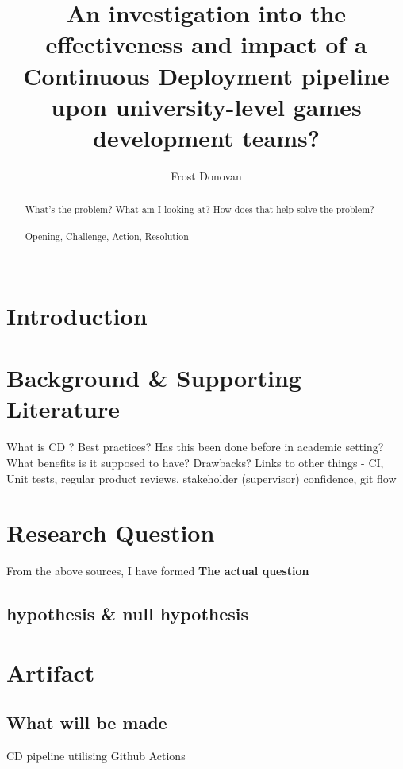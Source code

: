 \documentclass[lettersize,journal]{IEEEtran}
\begin{document}
\title{An investigation into the effectiveness and impact of a Continuous Deployment pipeline upon university-level games development teams?}

\author{Frost Donovan}

\maketitle

\begin{abstract}
    What's the problem? What am I looking at? How does that help solve the problem? \\
    \\
    Opening, Challenge, Action, Resolution \\
    \\
\end{abstract}

\section{Introduction}
    

\section{Background \& Supporting Literature}
    What is CD \cite{ContDelIntro,bamboo}? Best practices\cite{duvall2007continuous}? Has this been done before in academic setting\cite{CDCourse2014,CDMobileDev,Tornado,IndustryAcademyDenmark}? What benefits is it supposed to have\cite{ContDelIntro}? Drawbacks\cite{ContDelChall}? Links to other things - CI\cite{CICDCD}, Unit tests, regular product reviews, stakeholder (supervisor) confidence, git flow \cite{gitBranching}

\section{Research Question}
    From the above sources, I have formed \textbf{The actual question}
    \subsection{hypothesis \& null hypothesis}

\section{Artifact}
    \subsection{What will be made}
        CD pipeline utilising Github Actions
\end{document}
